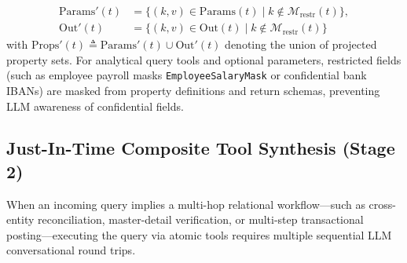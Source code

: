 \documentclass[conference,10pt]{IEEEtran}
\begin{document}
\begin{enumerate}
    \begin{equation}
    \begin{aligned}
    \text{Params}'(t) &= \{ (k, v) \in \text{Params}(t) \mid k \notin \mathcal{M}_{\text{restr}}(t) \}, \\
    \text{Out}'(t) &= \{ (k, v) \in \text{Out}(t) \mid k \notin \mathcal{M}_{\text{restr}}(t) \}
    \end{aligned}
    \end{equation}
    with $\text{Props}'(t) \triangleq \text{Params}'(t) \cup \text{Out}'(t)$ denoting the union of projected property sets. For analytical query tools and optional parameters, restricted fields (such as employee payroll masks \texttt{EmployeeSalaryMask} or confidential bank IBANs) are masked from property definitions and return schemas, preventing LLM awareness of confidential fields.
\end{enumerate}

\subsection{Just-In-Time Composite Tool Synthesis (Stage 2)}
When an incoming query implies a multi-hop relational workflow—such as cross-entity reconciliation, master-detail verification, or multi-step transactional posting—executing the query via atomic tools requires multiple sequential LLM conversational round trips.
\end{document}
